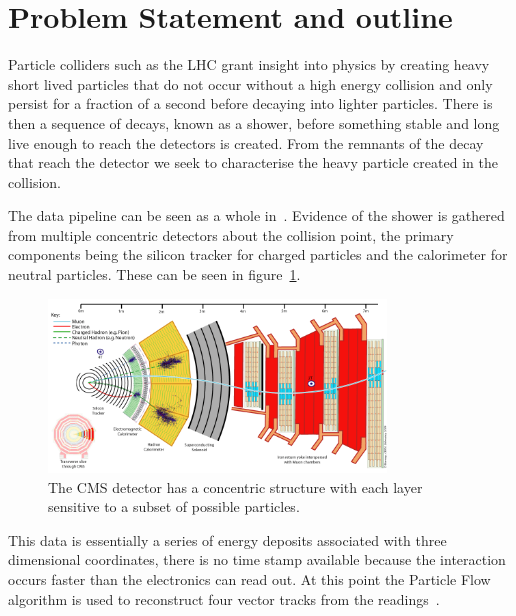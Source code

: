 \section{Problem Statement and outline}
Particle colliders such as the LHC grant insight into physics by
creating heavy short lived particles that do not occur without a high energy collision
and only persist for a fraction of a second before decaying into lighter particles.
There is then a sequence of decays, known as a shower, before something
stable and long live enough to reach the detectors is created.
From the remnants of the decay that reach the detector we seek
to characterise the heavy particle created in the collision.

The data pipeline can be seen as a whole in~\cite{Stoye_DeepCMS2018, Schramm:2291608}.
Evidence of the shower is gathered from multiple concentric detectors about the collision point, the primary components being the 
silicon tracker for charged particles and the calorimeter for neutral particles. 
These can be seen in figure~\ref{fig:lit_CMSdetector}.
\begin{figure}
    \centering
    \includegraphics[width=0.8\textwidth]{images/lit_CMSdetector.png}
    \caption{The CMS detector has a concentric structure with each layer sensitive to a subset of possible particles.
             \cite{Stoye_DeepCMS2018}}
    \label{fig:lit_CMSdetector}
\end{figure}
This data is essentially a series of energy deposits associated with three dimensional coordinates,
there is no time stamp available because the interaction occurs faster than the electronics can read out.
At this point the Particle Flow algorithm is used to reconstruct four vector tracks from the readings~\cite{Beaudette_particleFlow2013}.

